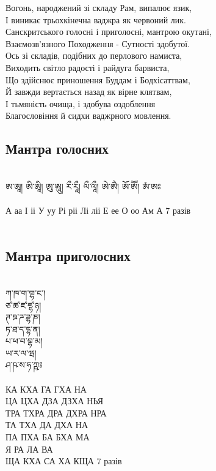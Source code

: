 Вогонь, народжений зі складу Рам, випалює язик,\\
І виникає трьохкінечна ваджра як червоний лик.\\
Санскритського голосні і приголосні, мантрою окутані,\\
Взаємозв’язного Походження - Сутності здобутої.\\
Ось зі складів, подібних до перлового намиста,\\
Виходить світло радості і райдуга барвиста,\\
Що здійснює приношення Буддам і Бодхісаттвам,\\
Й завжди вертається назад як вірне клятвам,\\
І тьмяність очища, і здобува оздоблення\\
Благословіння й сидхи ваджрного мовлення.

\newpage
\subsection*{Мантра голосних}
\\
\ti
ཨ་ཨཱ། ཨི་ཨཱི། ཨུ་ཨཱུ། རྀ་རཱྀ། ལྀ་ལཱྀ། ཨེ་ཨཻ། ཨོ་ཨཽ། ཨཾ་ཨཿ\\
\\
\ru
А аа І іі У уу Рі ріі Лі ліі Е ее О оо Ам А \hspace{1cm} 7 разів\\
\\
\subsection*{Мантра приголосних}
\\
\ti
ཀ་ཁ་ག་གྷ་ང་། \\
ཙ་ཚ་ཛ་ཛྷ་ཉ། \\
ཊ་ཋ་ཌ་ཌྷ་ཎ། \\
ཏ་ཐ་ད་དྷ་ན། \\
པ་ཕ་བ་བྷ་མ། \\
ཡ་ར་ལ་ཝ། \\
ཤ་ཥ་ས་ཧ་ཀྵཿ \\
\\
\ru
КА  КХА  ГА ГХА НА\\
ЦА  ЦХА  ДЗА ДЗХА НЬЯ\\
ТРА ТХРА ДРА ДХРА НРА\\
ТА  ТХА  ДА ДХА НА\\
ПА  ПХА  БА БХА МА\\
Я   РА   ЛА ВА\\
ЩА  КХА  СА ХА КЩА \hspace{1cm} 7 разів\\
\newpage
